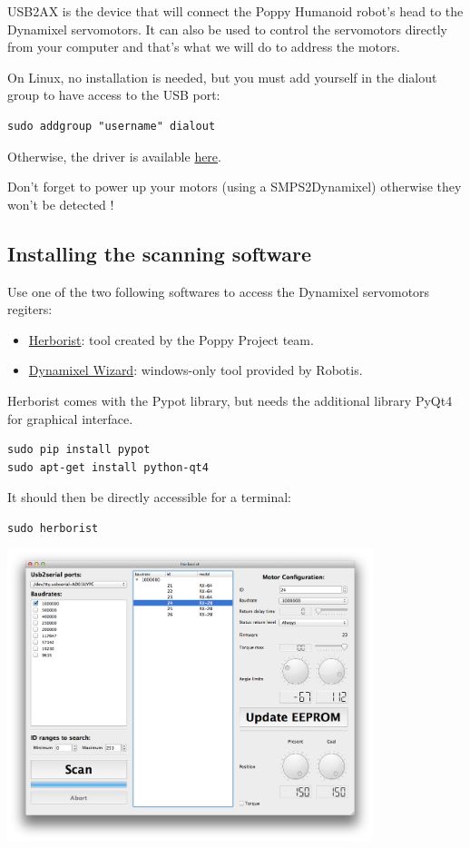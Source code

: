 \documentclass{article}
\begin{document}
USB2AX is the device that will connect the Poppy Humanoid robot's head to the Dynamixel servomotors. It can also be used to control the servomotors directly from your computer and that's what we will do to address the motors.

On Linux, no installation is needed, but you must add yourself in the dialout group to have access to the USB port:
 \begin{verbatim}
sudo addgroup "username" dialout
\end{verbatim}

Otherwise, the driver is available \href{http://www.xevelabs.com/doku.php?id=product:usb2ax:quickstart}{here}.

Don't forget to power up your motors (using a SMPS2Dynamixel) otherwise they won't be detected !

\subsection{Installing the scanning software}

Use one of the two following softwares to access the Dynamixel servomotors regiters:

\begin{itemize}
\item \href{http://poppy-project.github.io/pypot/herborist.html}{Herborist}: tool created by the Poppy Project team. 
\item \href{http://support.robotis.com/en/software/roboplus/dynamixel_monitor/quickstart/dynamixel\_monitor\_connection.htm}{Dynamixel Wizard}: windows-only tool provided by Robotis.
\end{itemize}

Herborist comes with the Pypot library, but needs the additional library PyQt4 for graphical interface.
\begin{verbatim}
sudo pip install pypot
sudo apt-get install python-qt4
\end{verbatim}

It should then be directly accessible for a terminal:
\begin{verbatim}
sudo herborist
\end{verbatim}
 \begin{center}
  \includegraphics[width=0.8\textwidth]{herborist}
 \end{center}
 
\end{document}
